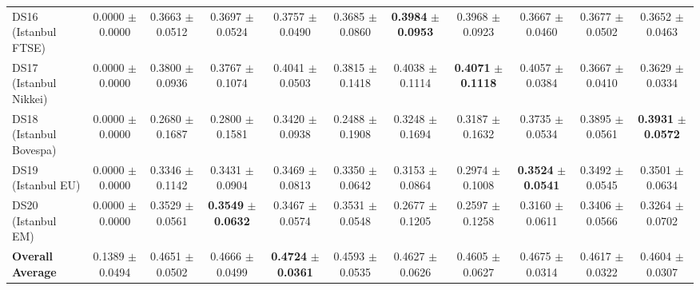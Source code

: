 \begin{table}[t]
{{\begin{tabular}{lcccccccccc}
DS16 (Istanbul FTSE) & 0.0000 $\pm$ 0.0000 & 0.3663 $\pm$ 0.0512 & 0.3697 $\pm$ 0.0524 & 0.3757 $\pm$ 0.0490 & 0.3685 $\pm$ 0.0860 & \textbf{0.3984} $\pm$ \textbf{0.0953} & 0.3968 $\pm$ 0.0923 & 0.3667 $\pm$ 0.0460 & 0.3677 $\pm$ 0.0502 & 0.3652 $\pm$ 0.0463 \\
DS17 (Istanbul Nikkei) & 0.0000 $\pm$ 0.0000 & 0.3800 $\pm$ 0.0936 & 0.3767 $\pm$ 0.1074 & 0.4041 $\pm$ 0.0503 & 0.3815 $\pm$ 0.1418 & 0.4038 $\pm$ 0.1114 & \textbf{0.4071} $\pm$ \textbf{0.1118} & 0.4057 $\pm$ 0.0384 & 0.3667 $\pm$ 0.0410 & 0.3629 $\pm$ 0.0334 \\
DS18 (Istanbul Bovespa) & 0.0000 $\pm$ 0.0000 & 0.2680 $\pm$ 0.1687 & 0.2800 $\pm$ 0.1581 & 0.3420 $\pm$ 0.0938 & 0.2488 $\pm$ 0.1908 & 0.3248 $\pm$ 0.1694 & 0.3187 $\pm$ 0.1632 & 0.3735 $\pm$ 0.0534 & 0.3895 $\pm$ 0.0561 & \textbf{0.3931} $\pm$ \textbf{0.0572} \\
DS19 (Istanbul EU) & 0.0000 $\pm$ 0.0000 & 0.3346 $\pm$ 0.1142 & 0.3431 $\pm$ 0.0904 & 0.3469 $\pm$ 0.0813 & 0.3350 $\pm$ 0.0642 & 0.3153 $\pm$ 0.0864 & 0.2974 $\pm$ 0.1008 & \textbf{0.3524} $\pm$ \textbf{0.0541} & 0.3492 $\pm$ 0.0545 & 0.3501 $\pm$ 0.0634 \\
DS20 (Istanbul EM) & 0.0000 $\pm$ 0.0000 & 0.3529 $\pm$ 0.0561 & \textbf{0.3549} $\pm$ \textbf{0.0632} & 0.3467 $\pm$ 0.0574 & 0.3531 $\pm$ 0.0548 & 0.2677 $\pm$ 0.1205 & 0.2597 $\pm$ 0.1258 & 0.3160 $\pm$ 0.0611 & 0.3406 $\pm$ 0.0566 & 0.3264 $\pm$ 0.0702 \\
\midrule
\textbf{Overall Average} & 0.1389 $\pm$ 0.0494 & 0.4651 $\pm$ 0.0502 & 0.4666 $\pm$ 0.0499 & \textbf{0.4724} $\pm$ \textbf{0.0361} & 0.4593 $\pm$ 0.0535 & 0.4627 $\pm$ 0.0626 & 0.4605 $\pm$ 0.0627 & 0.4675 $\pm$ 0.0314 & 0.4617 $\pm$ 0.0322 & 0.4604 $\pm$ 0.0307 \\
\bottomrule
\end{tabular}%
}%
}
\end{table}

